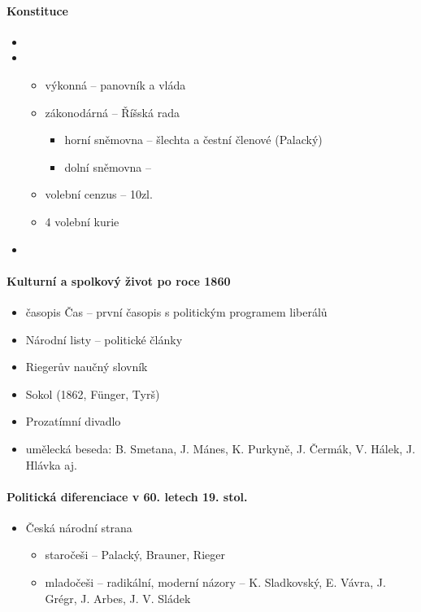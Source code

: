 \paragraph{Konstituce}
\begin{itemize}
\item {}
\item {}
	\begin{itemize}
	\item výkonná -- panovník a vláda
	\item zákonodárná -- Říšská rada
		\begin{itemize}
		\item horní sněmovna -- šlechta a čestní členové (Palacký)
		\item dolní sněmovna -- 
		\end{itemize}
	\item volební cenzus -- 10zl.
	\item 4 volební kurie
	\end{itemize}
\item {}
\end{itemize}

\paragraph{Kulturní a spolkový život po roce 1860}
\begin{itemize}
\item časopis Čas  -- první časopis s politickým programem liberálů
\item Národní listy -- politické články
\item Riegerův naučný slovník 
\item Sokol (1862, Fünger, Tyrš)
\item Prozatímní divadlo
\item umělecká beseda: B. Smetana, J. Mánes, K. Purkyně, J. Čermák, V. Hálek, J. Hlávka aj.
\end{itemize}

\paragraph{Politická diferenciace v 60. letech 19. stol.}
\begin{itemize}
\item Česká národní strana
	\begin{itemize}
	\item staročeši -- Palacký, Brauner, Rieger
	\item mladočeši -- radikální, moderní názory -- K. Sladkovský, E. Vávra, J. Grégr, J. Arbes, J. V. Sládek
	\end{itemize}
\end{itemize}

